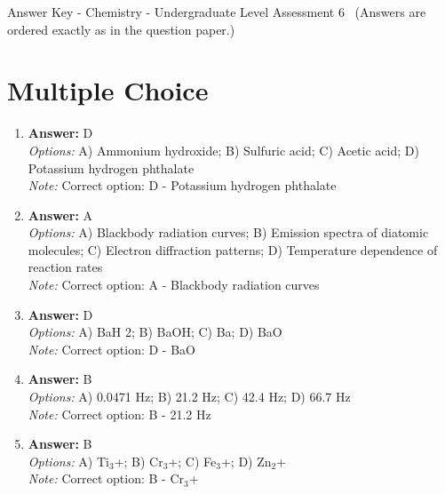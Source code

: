 \documentclass[12pt]{article}
\begin{document}
\begin{center}
Answer Key - Chemistry - Undergraduate Level Assessment 6 \
\small (Answers are ordered exactly as in the question paper.)
\end{center}

\section*{Multiple Choice}
\begin{enumerate}[label=\arabic*.]
\item \textbf{Answer:} D
\\ \textit{Options:} A) Ammonium hydroxide; B) Sulfuric acid; C) Acetic acid; D) Potassium hydrogen phthalate
\\ \textit{Note:} Correct option: D - Potassium hydrogen phthalate
\item \textbf{Answer:} A
\\ \textit{Options:} A) Blackbody radiation curves; B) Emission spectra of diatomic molecules; C) Electron diffraction patterns; D) Temperature dependence of reaction rates
\\ \textit{Note:} Correct option: A - Blackbody radiation curves
\item \textbf{Answer:} D
\\ \textit{Options:} A) BaH 2; B) BaOH; C) Ba; D) BaO
\\ \textit{Note:} Correct option: D - BaO
\item \textbf{Answer:} B
\\ \textit{Options:} A) 0.0471 Hz; B) 21.2 Hz; C) 42.4 Hz; D) 66.7 Hz
\\ \textit{Note:} Correct option: B - 21.2 Hz
\item \textbf{Answer:} B
\\ \textit{Options:} A) Ti$_{3}$+; B) Cr$_{3}$+; C) Fe$_{3}$+; D) Zn$_{2}$+
\\ \textit{Note:} Correct option: B - Cr$_{3}$+
\end{enumerate}
\end{document}
